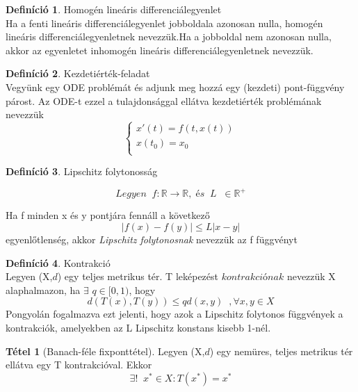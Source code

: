 \documentclass{article}
\theoremstyle{definition}
\theoremstyle{theorem}
\newtheorem{definition}{Definíció}
\newtheorem{theorem}{Tétel}
\begin{document}
\begin{definition}Homogén lineáris differenciálegyenlet\\
Ha a fenti lineáris differenciálegyenlet jobboldala azonosan nulla, homogén lineáris differenciálegyenletnek nevezzük.Ha a jobboldal nem azonosan nulla, akkor az egyenletet inhomogén lineáris differenciálegyenletnek nevezzük.
\end{definition}
\begin{definition}{Kezdetiérték-feladat}\\
Vegyünk egy ODE problémát és adjunk meg hozzá egy (kezdeti) pont-függvény párost. Az ODE-t ezzel a tulajdonsággal ellátva kezdetiérték problémának  nevezzük
\begin{equation*}
    \begin{cases}
       x'(t) = f(t,x(t))\\
       x(t_0) = x_0 \\
    \end{cases}
\end{equation*}
\end{definition}
\begin{definition}{Lipschitz folytonosság}

\begin{equation*}
Legyen \;\;    f : \mathbb{R} \rightarrow \mathbb{R}, \; és \;\; L\; \;\in \mathbb{R}^+
\end{equation*}

Ha f minden x és y pontjára fennáll a következő
\begin{equation*}
    |f(x) - f(y)| \leq L |x-y|
\end{equation*}
egyenlőtlenség, akkor \textit{Lipschitz folytonosnak} nevezzük az f függvényt
\end{definition}
\begin{definition}{Kontrakció}\\
Legyen (X,$\textit{d}$) egy teljes metrikus tér. T leképezést $\textit{kontrakciónak}$ nevezzük X alaphalmazon, ha $\exists$ $q \in [0,1)$, hogy
\begin{equation*}
    d(T(x),T(y)) \leq q \textit{d}(x,y) \;\;,\forall x,y \in X
\end{equation*}
Pongyolán fogalmazva ezt jelenti, hogy azok a  Lipschitz folytonos függvények a kontrakciók, amelyekben az L Lipschitz konstans kisebb 1-nél.
\end{definition}
\begin{theorem}[Banach-féle fixponttétel]
Legyen (X,$\textit{d}$) egy nemüres, teljes metrikus tér ellátva egy T kontrakcióval. Ekkor
\begin{equation*}
    \exists!\;\; x^* \in X : T(x^*) = x^*
\end{equation*}
\end{theorem}
\end{document}
